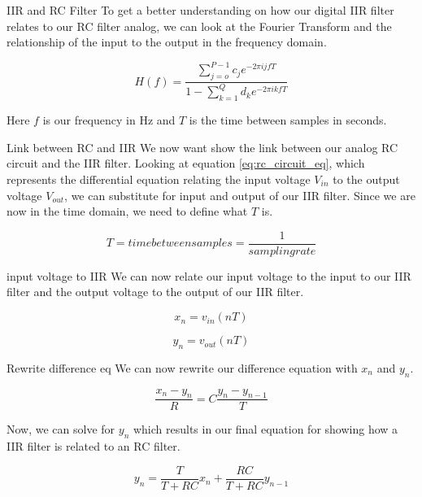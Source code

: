 \documentclass{beamer}
\begin{document}
\begin{frame}
\begin{block}{IIR and RC Filter}
To get a better understanding on how our digital IIR filter relates to our RC filter analog, we can look at the Fourier Transform and the relationship of the input to the output in the frequency domain.

\begin{equation}
H(f)=\frac{\displaystyle\sum\limits_{j=o}^{P-1} c_je^{-2\pi ijfT}}{1-\displaystyle\sum\limits_{k=1}^{Q} d_ke^{-2\pi ikfT}}
\end{equation}

Here $f$ is our frequency in Hz and $T$ is the time between samples in seconds.
\end{block}
\end{frame}

\begin{frame}
\begin{block}{Link between RC and IIR}
We now want show the link between our analog RC circuit and the IIR filter.  Looking at equation \ref{eq:rc_circuit_eq}, which represents the differential equation relating the input voltage $V_{in}$ to the output voltage $V_{out}$, we can substitute for input and output of our IIR filter.  Since we are now in the time domain, we need to define what $T$ is.

\begin{equation}
T=time between samples=\frac{1}{sampling rate}
\end{equation}
\end{block}
\end{frame}

\begin{frame}
\begin{block}{input voltage to IIR}
We can now relate our input voltage to the input to our IIR filter and the output voltage to the output of our IIR filter.

\begin{equation}
x_n=v_{in}(nT)
\end{equation}

\begin{equation}
y_n=v_{out}(nT)
\end{equation}
\end{block}
\end{frame}

\begin{frame}
\begin{block}{Rewrite difference eq}
We can now rewrite our difference equation with $x_n$ and $y_n$.

\begin{equation}
\frac{x_n-y_n}{R}=C\frac{y_n-y_{n-1}}{T}
\end{equation}

Now, we can solve for $y_n$ which results in our final equation for showing how a IIR filter is related to an RC filter.

\begin{equation}
y_n=\frac{T}{T+RC}x_n+\frac{RC}{T+RC}y_{n-1}
\end{equation}
\end{block}
\end{frame}
\end{document}
